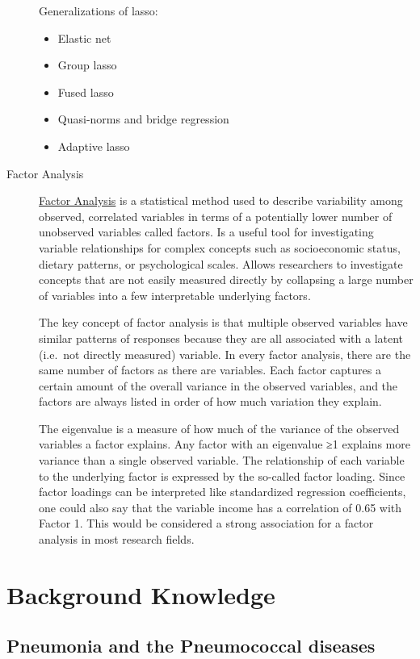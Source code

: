 \documentclass[
]{book}
\begin{document}
\begin{description}
Generalizations of lasso:

\begin{itemize}
\item
  Elastic net
\item
  Group lasso
\item
  Fused lasso
\item
  Quasi-norms and bridge regression
\item
  Adaptive lasso
\end{itemize}
\item[Factor Analysis]
\href{https://www.theanalysisfactor.com/factor-analysis-1-introduction/}{Factor Analysis} is a statistical method used to describe variability among observed, correlated variables in terms of a potentially lower number of unobserved variables called factors. Is a useful tool for investigating variable relationships for complex concepts such as socioeconomic status, dietary patterns, or psychological scales. Allows researchers to investigate concepts that are not easily measured directly by collapsing a large number of variables into a few interpretable underlying factors.

The key concept of factor analysis is that multiple observed variables have similar patterns of responses because they are all associated with a latent (i.e.~not directly measured) variable. In every factor analysis, there are the same number of factors as there are variables. Each factor captures a certain amount of the overall variance in the observed variables, and the factors are always listed in order of how much variation they explain.

The eigenvalue is a measure of how much of the variance of the observed variables a factor explains. Any factor with an eigenvalue ≥1 explains more variance than a single observed variable. The relationship of each variable to the underlying factor is expressed by the so-called factor loading. Since factor loadings can be interpreted like standardized regression coefficients, one could also say that the variable income has a correlation of 0.65 with Factor 1. This would be considered a strong association for a factor analysis in most research fields.
\end{description}

\hypertarget{intro}{%
\chapter{Background Knowledge}\label{intro}}

\hypertarget{pneumonia-and-the-pneumococcal-diseases}{%
\section{Pneumonia and the Pneumococcal diseases}\label{pneumonia-and-the-pneumococcal-diseases}}
\end{document}
